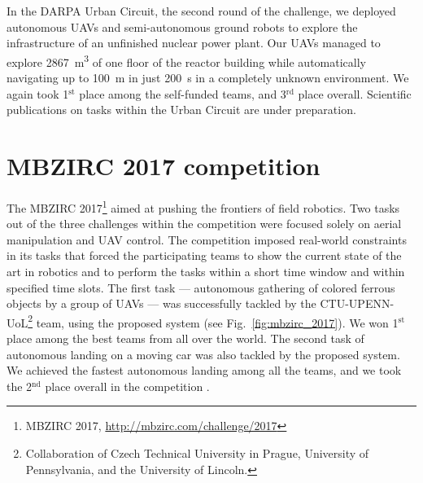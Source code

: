 \documentclass[a4paper,11pt,titlepage,twoside]{book}
\newcommand{\reffig}[1]{Fig.~\ref{#1}}
\begin{document}

In the \ac{DARPA} Urban Circuit, the second round of the challenge, we deployed autonomous \acp{UAV} and semi-autonomous ground robots to explore the infrastructure of an unfinished nuclear power plant.
Our \acp{UAV} managed to explore \SI{2867}{\meter\cubed} of one floor of the reactor building while automatically navigating up to \SI{100}{\meter} in just \SI{200}{\second} in a completely unknown environment.
We again took 1$^{\text{st}}$ place among the self-funded teams, and 3$^{\text{rd}}$ place overall.
Scientific publications on tasks within the Urban Circuit are under preparation.



\section{MBZIRC 2017 competition}

The \ac{MBZIRC} 2017\footnote{MBZIRC 2017, \url{http://mbzirc.com/challenge/2017}} aimed at pushing the frontiers of field robotics.
Two tasks out of the three challenges within the competition were focused solely on aerial manipulation and UAV control.
The competition imposed real-world constraints in its tasks that forced the participating teams to show the current state of the art in robotics and to perform the tasks within a short time window and within specified time slots.
The first task --- autonomous gathering of colored ferrous objects by a group of \acp{UAV} --- was successfully tackled by the CTU-UPENN-UoL\footnote{Collaboration of Czech Technical University in Prague, University of Pennsylvania, and the University of Lincoln.} team, using the proposed system \cite{spurny2019cooperative, faigl2019unsupervised, loianno2018localization} (see \reffig{fig:mbzirc_2017}).
We won 1$^{\mathrm{st}}$ place among the best teams from all over the world.
The second task of autonomous landing on a moving car was also tackled by the proposed system.
We achieved the fastest autonomous landing among all the teams, and we took the 2$^{\text{nd}}$ place overall in the competition \cite{baca2019autonomous, stepan2019vision}.

\end{document}
